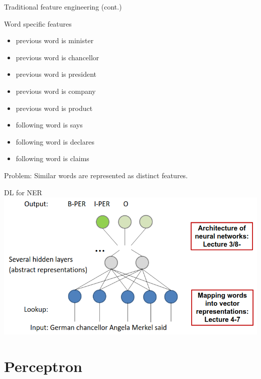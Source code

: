 \documentclass[12pt]{beamer}
\begin{document}
\begin{frame}{Traditional feature engineering (cont.)}
	
	Word specific features
	
	\begin{itemize}
		\item previous word is minister
		\item previous word is chancellor
		\item previous word is president
		\item previous word is company
		\item previous word is product
		\item following word is says
		\item following word is declares
		\item following word is claims
	\end{itemize}
	
	Problem: Similar words are represented as distinct features.
\end{frame}

\begin{frame}{DL for NER}
		\includegraphics[width=\linewidth]{img/screenshot_2021-03-24_17-19-10.png}
\end{frame}


\section{Perceptron}
\end{document}
